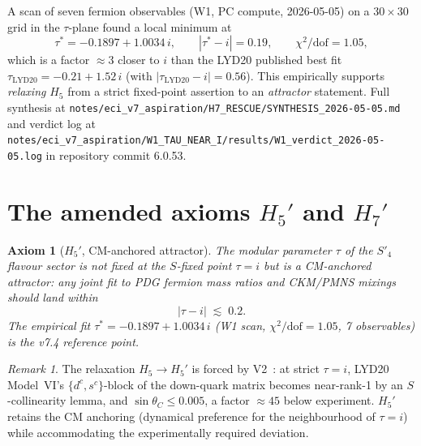 \documentclass[a4paper,11pt]{article}
\newcommand{\Spf}{S'_4}
\newtheorem*{axiom*}{Axiom}
\theoremstyle{definition}
\theoremstyle{remark}
\newtheorem{remark}[theorem]{Remark}
\begin{document}
A scan of seven fermion observables (W1, PC compute, 2026-05-05) on a
$30\times 30$ grid in the $\tau$-plane found a local minimum at
\begin{equation}
  \tau^{*} = -0.1897 + 1.0034\,i,\qquad
  |\tau^{*} - i| = 0.19,\qquad
  \chi^{2}/\mathrm{dof} = 1.05,
\end{equation}
which is a factor $\approx 3$ closer to $i$ than the LYD20 published
best fit $\tau_{\mathrm{LYD20}}=-0.21+1.52\,i$ (with
$|\tau_{\mathrm{LYD20}}-i|=0.56$).  This empirically supports
\emph{relaxing} $H_5$ from a strict fixed-point assertion to an
\emph{attractor} statement.  Full synthesis at
\texttt{notes/eci\_v7\_aspiration/H7\_RESCUE/SYNTHESIS\_2026-05-05.md}
and verdict log at
\texttt{notes/eci\_v7\_aspiration/W1\_TAU\_NEAR\_I/results/W1\_verdict\_2026-05-05.log}
in repository commit 6.0.53.

\section{The amended axioms $H_5'$ and $H_7'$}
\label{sec:amended}

\begin{axiom*}[$H_5'$, CM-anchored attractor]
The modular parameter $\tau$ of the $\Spf$ flavour sector is not
fixed at the $S$-fixed point $\tau=i$ but is a \emph{CM-anchored
attractor}: any joint fit to PDG fermion mass ratios and CKM/PMNS
mixings should land within
\[
  |\tau - i| \;\lesssim\; 0.2.
\]
The empirical fit $\tau^{*}=-0.1897+1.0034\,i$ (W1 scan,
$\chi^{2}/\mathrm{dof}=1.05$, 7 observables) is the v7.4 reference
point.
\end{axiom*}

\begin{remark}
The relaxation $H_5\to H_5'$ is forced by V2~\cite{V2NoGo}: at strict
$\tau=i$, LYD20 Model~VI's $\{d^{c},s^{c}\}$-block of the down-quark
matrix becomes near-rank-1 by an $S$-collinearity lemma, and
$\sin\theta_C\le 0.005$, a factor $\approx 45$ below experiment.
$H_5'$ retains the CM anchoring (dynamical preference for the
neighbourhood of $\tau=i$) while accommodating the experimentally
required deviation.
\end{remark}
\end{document}
